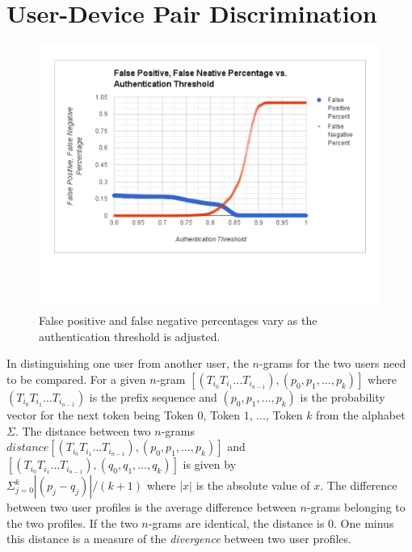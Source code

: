 \documentclass{acm_proc_article-sp}
\begin{document}
\section{User-Device Pair Discrimination}
\label{sec:differentiation}

\begin{figure}
\centering
\includegraphics[width=.45\textwidth]{false_positive_vs_authentication_threshold.pdf}
\caption{False positive and false negative percentages vary as the authentication threshold is adjusted.}
\label{fig:threshold_vs_percentages}
\end{figure}

In distinguishing one user from another user, 
the $n$-grams for the two users need to be compared. 
For a given $n$-gram 
$[(T_{i_0} T_{i_1} \dots T_{i_{n-1}}), (p_0, p_1, \dots, p_k)]$ where 
$(T_{i_0} T_{i_1} \dots T_{i_{n-1}})$ is the prefix sequence and 
$(p_0, p_1, \dots, p_k)$ is the
probability vector for the next token being 
Token $0$, Token $1$, $\dots$, Token $k$ from the alphabet $\Sigma$.
The distance between two $n$-grams 
$distance[(T_{i_0} T_{i_1} \dots T_{i_{n-1}}), (p_0, p_1, \dots, p_k)]$ and \\
$[(T_{i_0} T_{i_1} \dots T_{i_{n-1}}), (q_0, q_1, \dots, q_k)]$ is given by \\
$\Sigma_{j=0}^k|(p_j - q_j)|/(k+1)$ where $|x|$ is the absolute value of $x$.
The difference between two user profiles is 
the average difference between $n$-grams belonging
to the two profiles.
If the two $n$-grams are identical, the distance is 0.
One minus this distance is a measure of the {\it divergence} between two user profiles.
\end{document}
